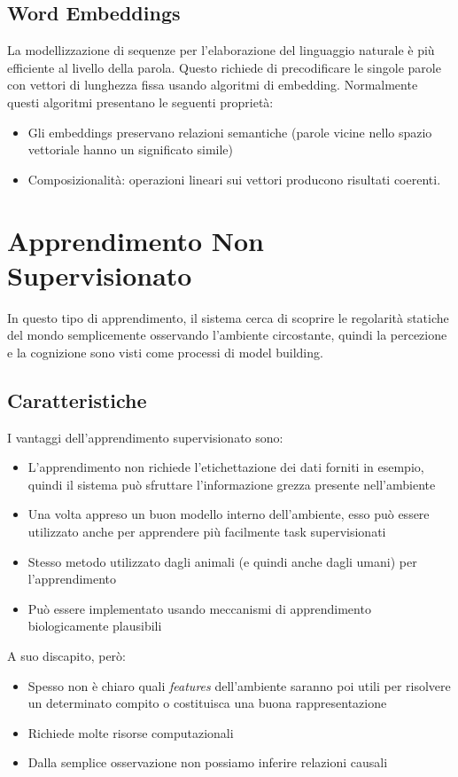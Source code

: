 \documentclass[12pt, a4paper]{article}
\begin{document}
\subsection{Word Embeddings}
La modellizzazione di sequenze per l'elaborazione del linguaggio naturale è più efficiente al livello della parola. Questo richiede di precodificare le singole parole con vettori di lunghezza fissa usando algoritmi di embedding.
Normalmente questi algoritmi presentano le seguenti proprietà:
\begin{itemize}
    \item Gli embeddings preservano relazioni semantiche (parole vicine nello spazio vettoriale hanno un significato simile)
    \item Composizionalità: operazioni lineari sui vettori producono risultati coerenti.
\end{itemize}

\newpage
\section{Apprendimento Non Supervisionato}
In questo tipo di apprendimento, il sistema cerca di scoprire le regolarità statiche del mondo semplicemente osservando l'ambiente circostante, quindi la percezione e la cognizione sono visti come processi di model building.
\subsection{Caratteristiche}
I vantaggi dell'apprendimento supervisionato sono:
\begin{itemize}
    \item L'apprendimento non richiede l'etichettazione dei dati forniti in esempio, quindi il sistema può sfruttare l'informazione grezza presente nell'ambiente
    \item Una volta appreso un buon modello interno dell'ambiente, esso può essere utilizzato anche per apprendere più facilmente task supervisionati
    \item Stesso metodo utilizzato dagli animali (e quindi anche dagli umani) per l'apprendimento
    \item Può essere implementato usando meccanismi di apprendimento biologicamente plausibili
\end{itemize}
A suo discapito, però:
\begin{itemize}
    \item Spesso non è chiaro quali \textit{features} dell'ambiente saranno poi utili per risolvere un determinato compito o costituisca una buona rappresentazione
    \item Richiede molte risorse computazionali
    \item Dalla semplice osservazione non possiamo inferire relazioni causali
\end{itemize}
\end{document}
